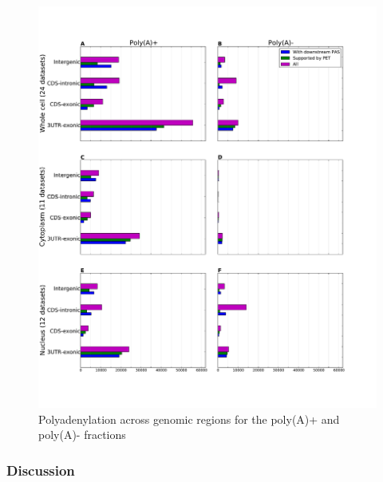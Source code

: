 \begin{figure}[htb]
	\begin{center}
		\includegraphics[scale=0.4]{figures/polyadenylation/Sidebars_pA_2+.pdf}
	\end{center}
	\caption{Polyadenylation across genomic regions for the poly(A)+ and poly(A)-
	fractions}
	\label{fig:sidebars}
\end{figure}

\subsubsection{Discussion}
